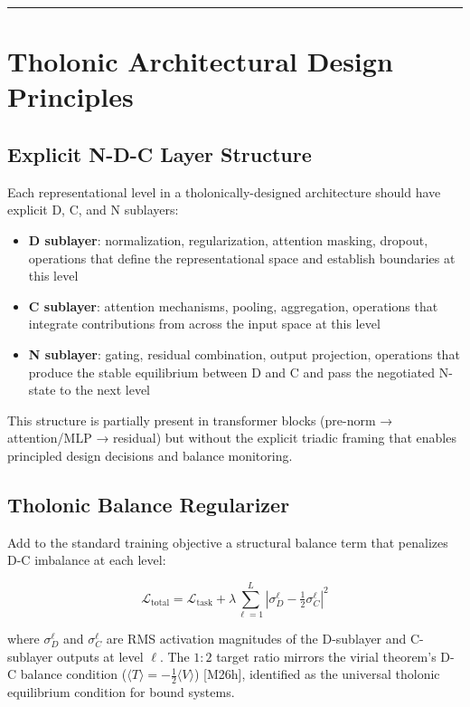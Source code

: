 \documentclass[12pt]{article}
\providecommand{\tightlist}{%
  \setlength{\itemsep}{0pt}\setlength{\parskip}{0pt}}
\begin{document}
\begin{center}\rule{0.5\linewidth}{0.5pt}\end{center}

\section{Tholonic Architectural Design Principles}\label{tholonic-architectural-design-principles}

\subsection{Explicit N-D-C Layer Structure}\label{explicit-n-d-c-layer-structure}

Each representational level in a tholonically-designed architecture
should have explicit D, C, and N sublayers:

\begin{itemize}
\tightlist
\item
  \textbf{D sublayer}: normalization, regularization, attention masking,
  dropout, operations that define the representational space and
  establish boundaries at this level
\item
  \textbf{C sublayer}: attention mechanisms, pooling, aggregation,
  operations that integrate contributions from across the input space at
  this level
\item
  \textbf{N sublayer}: gating, residual combination, output projection,
  operations that produce the stable equilibrium between D and C and
  pass the negotiated N-state to the next level
\end{itemize}

This structure is partially present in transformer blocks (pre-norm →
attention/MLP → residual) but without the explicit triadic framing that
enables principled design decisions and balance monitoring.

\subsection{Tholonic Balance Regularizer}\label{tholonic-balance-regularizer}

Add to the standard training objective a structural balance term that
penalizes D-C imbalance at each level:

\[\mathcal{L}_{\text{total}} = \mathcal{L}_{\text{task}} + \lambda \sum_{\ell=1}^{L} \left| \sigma_D^\ell - \tfrac{1}{2} \sigma_C^\ell \right|^2\]

where \(\sigma_D^\ell\) and \(\sigma_C^\ell\) are RMS activation
magnitudes of the D-sublayer and C-sublayer outputs at level \(\ell\).
The \(1:2\) target ratio mirrors the virial theorem's D-C balance
condition (\(\langle T \rangle = -\frac{1}{2}\langle V \rangle\))
{[}M26h{]}, identified as the universal tholonic equilibrium condition
for bound systems.
\end{document}
